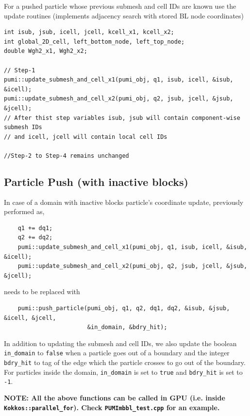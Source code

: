 \documentclass[a4paper,12pt]{article}
\begin{document}
For a pushed particle whose previous submesh and cell IDs are known use the update routines (implements adjacency search with stored BL node coordinates)

\begin{verbatim}
int isub, jsub, icell, jcell, kcell_x1, kcell_x2;
int global_2D_cell, left_bottom_node, left_top_node;
double Wgh2_x1, Wgh2_x2;

// Step-1
pumi::update_submesh_and_cell_x1(pumi_obj, q1, isub, icell, &isub, &icell);
pumi::update_submesh_and_cell_x2(pumi_obj, q2, jsub, jcell, &jsub, &jcell);
// After thist step variables isub, jsub will contain component-wise submesh IDs
// and icell, jcell will contain local cell IDs

//Step-2 to Step-4 remains unchanged
\end{verbatim}

\subsection{Particle Push (with inactive blocks)}
In case of a domain with inactive blocks particle's coordinate update, previously performed as,
\begin{verbatim}
	q1 += dq1;
	q2 += dq2;
	pumi::update_submesh_and_cell_x1(pumi_obj, q1, isub, icell, &isub, &icell);
	pumi::update_submesh_and_cell_x2(pumi_obj, q2, jsub, jcell, &jsub, &jcell);
\end{verbatim}
needs to be replaced with
\begin{verbatim}
	pumi::push_particle(pumi_obj, q1, q2, dq1, dq2, &isub, &jsub, &icell, &jcell, 
	                    &in_domain, &bdry_hit);
\end{verbatim} 
In addition to updating the submesh and cell IDs, we also update the boolean \texttt{in\_domain} to \texttt{false} when a particle goes out of a boundary and the integer \texttt{bdry\_hit} to tag of the edge which the particle crosses to go out of the boundary. For particles inside the domain, \texttt{in\_domain} is set to \texttt{true} and \texttt{bdry\_hit} is set to \texttt{-1}.



\noindent\textbf{NOTE: All the above functions can be called in GPU (i.e. inside \texttt{Kokkos::parallel\_for}). Check \texttt{PUMImbbl\_test.cpp} for an example.}
\end{document}
